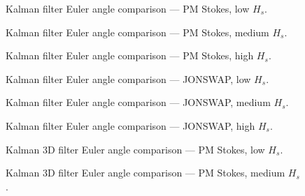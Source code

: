 \documentclass[11pt,letterpaper]{article}
\begin{document}
\begin{figure}[H]\centering
  \resizebox{\textwidth}{!}{}
  \caption{Kalman filter Euler angle comparison — PM Stokes, low $H_s$.}
  \label{fig:qmekf_pmstokes_low}
\end{figure}

\begin{figure}[H]\centering
  \resizebox{\textwidth}{!}{}
  \caption{Kalman filter Euler angle comparison — PM Stokes, medium $H_s$.}
  \label{fig:qmekf_pmstokes_medium}
\end{figure}

\begin{figure}[H]\centering
  \resizebox{\textwidth}{!}{}
  \caption{Kalman filter Euler angle comparison — PM Stokes, high $H_s$.}
  \label{fig:qmekf_pmstokes_high}
\end{figure}

\begin{figure}[H]\centering
  \resizebox{\textwidth}{!}{}
  \caption{Kalman filter Euler angle comparison — JONSWAP, low $H_s$.}
  \label{fig:qmekf_jonswap_low}
\end{figure}

\begin{figure}[H]\centering
  \resizebox{\textwidth}{!}{}
  \caption{Kalman filter Euler angle comparison — JONSWAP, medium $H_s$.}
  \label{fig:qmekf_jonswap_medium}
\end{figure}

\begin{figure}[H]\centering
  \resizebox{\textwidth}{!}{}
  \caption{Kalman filter Euler angle comparison — JONSWAP, high $H_s$.}
  \label{fig:qmekf_jonswap_high}
\end{figure}


\begin{figure}[H]\centering
  \resizebox{\textwidth}{!}{}
  \caption{Kalman 3D filter Euler angle comparison — PM Stokes, low $H_s$.}
  \label{fig:w3d_pmstokes_low}
\end{figure}

\begin{figure}[H]\centering
  \resizebox{\textwidth}{!}{}
  \caption{Kalman 3D filter Euler angle comparison — PM Stokes, medium $H_s$.}
  \label{fig:w3d_pmstokes_medium}
\end{figure}
\end{document}
